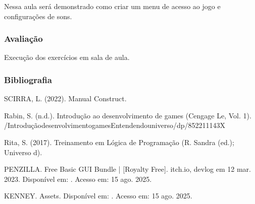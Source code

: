 \documentclass[letterpaper,10pt,brazil]{sphinxmanual}
\begin{document}
\sphinxAtStartPar
Nessa aula será demonstrado como criar um menu de acesso ao jogo e configurações de sons.
\subsubsection*{Avaliação}

\sphinxAtStartPar
Execução dos exercícios em sala de aula.

\newpage
\subsubsection*{Bibliografia}

\sphinxAtStartPar
SCIRRA, L. (2022). Manual Construct.

\sphinxAtStartPar
Rabin, S. (n.d.). Introdução ao desenvolvimento de games (Cengage Le, Vol. 1).
/Introdução\sphinxhyphen{}desenvolvimento\sphinxhyphen{}games\sphinxhyphen{}Entendendo\sphinxhyphen{}universo/dp/852211143X

\sphinxAtStartPar
Rita, S. (2017). Treinamento em Lógica de Programação (R. Sandra (ed.); Universo d).

\sphinxAtStartPar
PENZILLA. Free Basic GUI Bundle | {[}Royalty Free{]}. itch.io, devlog em 12 mar. 2023.
Disponível em: . Acesso em: 15 ago. 2025.

\sphinxAtStartPar
KENNEY. Assets. Disponível em: . Acesso em: 15 ago. 2025.



\renewcommand{\indexname}{Índice}
\printindex
\end{document}

